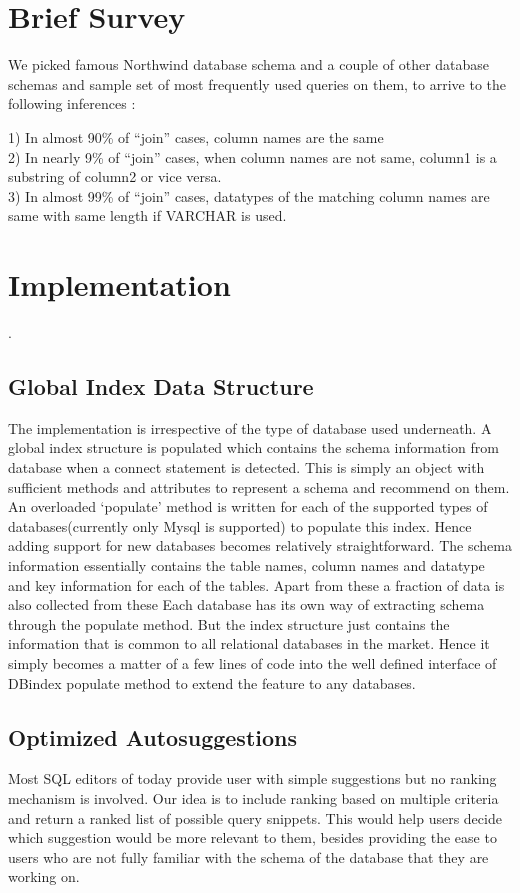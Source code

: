 \documentclass{acm_proc_article-sp}
\begin{document}
\section{Brief Survey}
We picked famous Northwind database schema and a couple of other database schemas and sample set of most frequently used queries on them, to arrive to the following inferences : 

1) In almost 90\% of ``join'' cases, column names are the same
\\2) In nearly 9\% of ``join'' cases, when column names are not same, column1 is a substring of column2 or vice versa.
\\3) In almost 99\% of ``join'' cases, datatypes of the matching column names are same with same length if VARCHAR is used. 

\section{Implementation}
.

\subsection{Global Index Data Structure}
The implementation is irrespective of the type of database used underneath. A global index structure is populated which contains the schema information from database when a connect statement is detected. This is simply an object with sufficient methods and attributes to represent a schema and recommend on them. An overloaded `populate' method is written for each of the supported types of databases(currently only Mysql is supported) to populate this index. Hence adding support for new databases becomes relatively straightforward. 
The schema information essentially contains the table names, column names and datatype and key information for each of the tables. Apart from these a fraction of data is also collected from these 
Each database has its own way of extracting schema through the populate method. But the index structure just contains the information that is common to all relational databases in the market. Hence it simply becomes a matter of a few lines of code into the well defined interface of DBindex populate method to extend the feature to any databases.  

\subsection{Optimized Autosuggestions}
Most SQL editors of today provide user with simple suggestions but no ranking mechanism is involved. Our idea is to include ranking based on multiple criteria and return a ranked list of possible query snippets. This would help users decide which suggestion would be more relevant to them, besides providing the ease to users who are not fully familiar with the schema of the database that they are working on.
\end{document}
